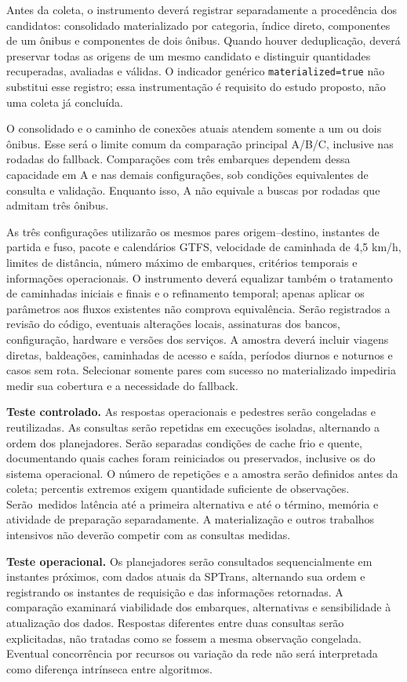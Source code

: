 Antes da coleta, o instrumento deverá registrar separadamente a procedência dos candidatos: consolidado materializado por categoria, índice direto, componentes de um ônibus e componentes de dois ônibus. Quando houver deduplicação, deverá preservar todas as origens de um mesmo candidato e distinguir quantidades recuperadas, avaliadas e válidas. O indicador genérico \texttt{materialized=true} não substitui esse registro; essa instrumentação é requisito do estudo proposto, não uma coleta já concluída.

O consolidado e o caminho de conexões atuais atendem somente a um ou dois ônibus. Esse será o limite comum da comparação principal A/B/C, inclusive nas rodadas do fallback. Comparações com três embarques dependem dessa capacidade em A e nas demais configurações, sob condições equivalentes de consulta e validação. Enquanto isso, A não equivale a buscas por rodadas que admitam três ônibus.

As três configurações utilizarão os mesmos pares origem--destino, instantes de partida e fuso, pacote e calendários GTFS, velocidade de caminhada de 4,5 km/h, limites de distância, número máximo de embarques, critérios temporais e informações operacionais. O instrumento deverá equalizar também o tratamento de caminhadas iniciais e finais e o refinamento temporal; apenas aplicar os parâmetros aos fluxos existentes não comprova equivalência. Serão registrados a revisão do código, eventuais alterações locais, assinaturas dos bancos, configuração, hardware e versões dos serviços. A amostra deverá incluir viagens diretas, baldeações, caminhadas de acesso e saída, períodos diurnos e noturnos e casos sem rota. Selecionar somente pares com sucesso no materializado impediria medir sua cobertura e a necessidade do fallback.

\textbf{Teste controlado.} As respostas operacionais e pedestres serão congeladas e reutilizadas. As consultas serão repetidas em execuções isoladas, alternando a ordem dos planejadores. Serão separadas condições de cache frio e quente, documentando quais caches foram reiniciados ou preservados, inclusive os do sistema operacional. O número de repetições e a amostra serão definidos antes da coleta; percentis extremos exigem quantidade suficiente de observações. Serão~medidos latência até a primeira alternativa e até o término, memória e atividade de preparação separadamente. A materialização e outros trabalhos intensivos não deverão competir com as consultas medidas.

\textbf{Teste operacional.} Os planejadores serão consultados sequencialmente em instantes próximos, com dados atuais da SPTrans, alternando sua ordem e registrando os instantes de requisição e das informações retornadas. A comparação examinará viabilidade dos embarques, alternativas e sensibilidade à atualização dos dados. Respostas diferentes entre duas consultas serão explicitadas, não tratadas como se fossem a mesma observação congelada. Eventual concorrência por recursos ou variação da rede não será interpretada como diferença intrínseca entre algoritmos.

